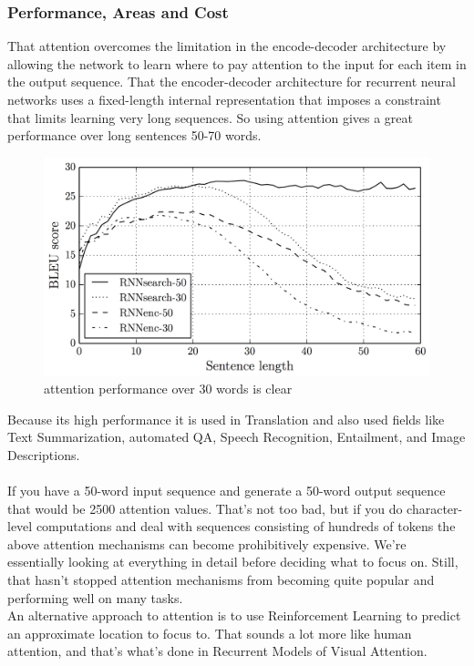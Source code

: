 \subsubsection{Performance, Areas and Cost}
That attention overcomes the limitation in the encode-decoder architecture by allowing the network to learn where to pay attention to the input for each item in the output sequence. That the encoder-decoder architecture for recurrent neural networks uses a fixed-length internal representation that imposes a constraint that limits learning very long sequences. So using attention gives a great performance over long sentences 50-70 words.\\ 
\begin{figure}[H]%
    \center%
    \includegraphics[width=\textwidth]{images/amir/bahdanau_attn.png}%
    \caption[Attention Performance]{  attention performance over 30 words is clear
    }\label{fig:attention performance}%
  \end{figure}
Because its high performance it is used in Translation and also used fields like Text Summarization, automated QA, Speech Recognition, Entailment, and Image Descriptions.\cite{web020}\\\\
If you have a 50-word input sequence and generate a 50-word output sequence that would be 2500 attention values. That’s not too bad, but if you do character-level computations and deal with sequences consisting of hundreds of tokens the above attention mechanisms can become prohibitively expensive. We’re essentially looking at everything in detail before deciding what to focus on. Still, that hasn’t stopped attention mechanisms from becoming quite popular and performing well on many tasks.\\
An alternative approach to attention is to use Reinforcement Learning to predict an approximate location to focus to. That sounds a lot more like human attention, and that’s what’s done in Recurrent Models of Visual Attention.